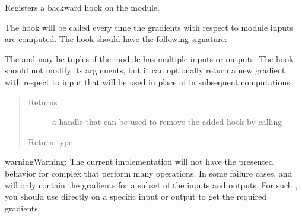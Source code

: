 \documentclass[letterpaper,10pt,english]{sphinxmanual}
\begin{document}
\begin{fulllineitems}
\begin{fulllineitems}
\label{\detokenize{api/autoencoding:geology.metamodelling.SpatialAutoencoder.register_backward_hook}}
Registers a backward hook on the module.

The hook will be called every time the gradients with respect to module
inputs are computed. The hook should have the following signature:

\begin{sphinxVerbatim}[commandchars=\\\{\}]
      
\end{sphinxVerbatim}

The  and  may be tuples if the
module has multiple inputs or outputs. The hook should not modify its
arguments, but it can optionally return a new gradient with respect to
input that will be used in place of  in subsequent
computations.
\begin{quote}\begin{description}
\item[{Returns}] \leavevmode
a handle that can be used to remove the added hook by calling

\item[{Return type}] \leavevmode
{}

\end{description}\end{quote}

\begin{sphinxadmonition}{warning}{Warning:}
The current implementation will not have the presented behavior
for complex  that perform many operations.
In some failure cases,  and  will only
contain the gradients for a subset of the inputs and outputs.
For such , you should use 
directly on a specific input or output to get the required gradients.
\end{sphinxadmonition}


\end{fulllineitems}
\end{fulllineitems}
\end{document}
